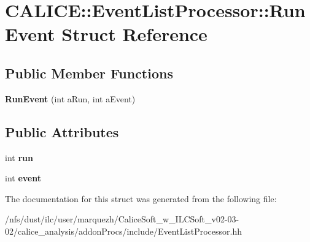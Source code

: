 \section{C\-A\-L\-I\-C\-E\-:\-:Event\-List\-Processor\-:\-:Run\-Event Struct Reference}
\label{structCALICE_1_1EventListProcessor_1_1RunEvent}
\subsection*{Public Member Functions}
\begin{DoxyCompactItemize}
\item 
{\bfseries Run\-Event} (int a\-Run, int a\-Event)\label{structCALICE_1_1EventListProcessor_1_1RunEvent_a2117bde5cb5ead53a8daf77ed193f3e9}

\end{DoxyCompactItemize}
\subsection*{Public Attributes}
\begin{DoxyCompactItemize}
\item 
int {\bfseries run}\label{structCALICE_1_1EventListProcessor_1_1RunEvent_aa9b0c155d4cf3ea9d147cbabc3a79447}

\item 
int {\bfseries event}\label{structCALICE_1_1EventListProcessor_1_1RunEvent_a40064a67f8e051319bd72a269763414b}

\end{DoxyCompactItemize}


The documentation for this struct was generated from the following file\-:\begin{DoxyCompactItemize}
\item 
/nfs/dust/ilc/user/marquezh/\-Calice\-Soft\-\_\-w\-\_\-\-I\-L\-C\-Soft\-\_\-v02-\/03-\/02/calice\-\_\-analysis/addon\-Procs/include/Event\-List\-Processor.\-hh\end{DoxyCompactItemize}
